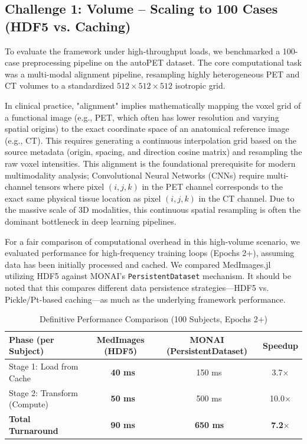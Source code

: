 \documentclass[10pt,letterpaper]{article}
\begin{document}
\subsection*{Challenge 1: Volume -- Scaling to 100 Cases (HDF5 vs. Caching)}
To evaluate the framework under high-throughput loads, we benchmarked a 100-case preprocessing pipeline on the autoPET dataset. The core computational task was a multi-modal alignment pipeline, resampling highly heterogeneous PET and CT volumes to a standardized $512 \times 512 \times 512$ isotropic grid. 

In clinical practice, "alignment" implies mathematically mapping the voxel grid of a functional image (e.g., PET, which often has lower resolution and varying spatial origins) to the exact coordinate space of an anatomical reference image (e.g., CT). This requires generating a continuous interpolation grid based on the source metadata (origin, spacing, and direction cosine matrix) and resampling the raw voxel intensities. This alignment is the foundational prerequisite for modern multimodality analysis; Convolutional Neural Networks (CNNs) require multi-channel tensors where pixel $(i,j,k)$ in the PET channel corresponds to the exact same physical tissue location as pixel $(i,j,k)$ in the CT channel. Due to the massive scale of 3D modalities, this continuous spatial resampling is often the dominant bottleneck in deep learning pipelines.

For a fair comparison of computational overhead in this high-volume scenario, we evaluated performance for high-frequency training loops (Epochs 2+), assuming data has been initially processed and cached. We compared MedImages.jl utilizing HDF5 against MONAI's \texttt{PersistentDataset} mechanism. It should be noted that this compares different data persistence strategies—HDF5 vs. Pickle/Pt-based caching—as much as the underlying framework performance.

\begin{table}[H]
\centering
\caption{Definitive Performance Comparison (100 Subjects, Epochs 2+)}
\begin{tabular}{|l|c|c|c|}
\hline
\textbf{Phase (per Subject)} & \textbf{MedImages (HDF5)} & \textbf{MONAI (PersistentDataset)} & \textbf{Speedup} \\
\hline
Stage 1: Load from Cache & \textbf{~40 ms} & ~150 ms & 3.7$\times$ \\
Stage 2: Transform (Compute) & \textbf{~50 ms} & ~500 ms & 10.0$\times$ \\
\hline
\textbf{Total Turnaround} & \textbf{~90 ms} & \textbf{~650 ms} & \textbf{7.2$\times$} \\
\hline
\end{tabular}
\label{tab:scaling_comparison}
\end{table}
\end{document}
